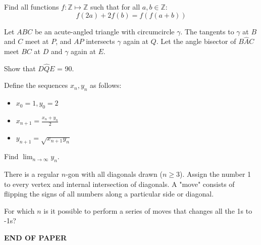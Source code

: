 \documentclass{exam}
\begin{document}
\begin{questions}
    \question[50]
    Find all functions $f : \mathbb{Z} \mapsto \mathbb{Z}$ such that for all $a, b \in \mathbb{Z}$:
    \[ f(2a) + 2f(b) = f(f(a+b)) \]

    \question[50]
    Let $ABC$ be an acute-angled triangle with circumcircle $\gamma$. The tangents to $\gamma$ at $B$ and $C$ meet at $P$, and $AP$ intersects $\gamma$ again at $Q$.
    Let the angle bisector of $B \hat A C$ meet $BC$ at $D$ and $\gamma$ again at $E$.

    Show that $D \hat Q E$ = 90.

    \question[60]
    Define the sequences $x_n, y_n$ as follows:
    \begin{itemize}
        \item
        $x_0 = 1, y_0 = 2$
        \item
        $x_{n+1} = \frac{x_n + y_n}{2}$
        \item
        $y_{n+1} = \sqrt{x_{n+1}y_n}$
    \end{itemize}

    Find $\lim_{n \to \infty} y_n$.

    \question[60]
    There is a regular $n$-gon with all diagonals drawn ($n \geq 3$). Assign the number 1 to every vertex and internal intersection of diagonals.
    A "move" consists of flipping the signs of all numbers along a particular side or diagonal.

    For which $n$ is it possible to perform a series of moves that changes all the 1s to -1s?

\end{questions}


\centering \LARGE \textbf{END OF PAPER}
\end{document}
